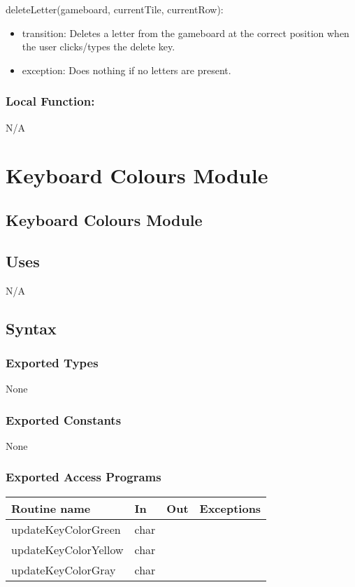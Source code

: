 \documentclass[12pt]{article}
\begin{document}
\noindent deleteLetter(gameboard, currentTile, currentRow):
\begin{itemize}
  \item transition: Deletes a letter from the gameboard at the correct position when the user clicks/types the delete key. 
  \item exception: Does nothing if no letters are present.
\end{itemize}

\subsubsection*{Local Function:}

N/A

\newpage

\section {Keyboard Colours Module}

\subsection* {Keyboard Colours Module}

\subsection* {Uses}

N/A

\subsection* {Syntax}

\subsubsection* {Exported Types}

None

\subsubsection* {Exported Constants}

None

\subsubsection* {Exported Access Programs}

\begin{tabular}{| l | l | l | p{6cm} |}
\hline
\textbf{Routine name} & \textbf{In} & \textbf{Out} & \textbf{Exceptions}\\
\hline
updateKeyColorGreen & char & ~ &  \\
\hline
updateKeyColorYellow & char & ~ &  \\
\hline
updateKeyColorGray & char & ~ &  \\
\hline
\end{tabular}
\end{document}

